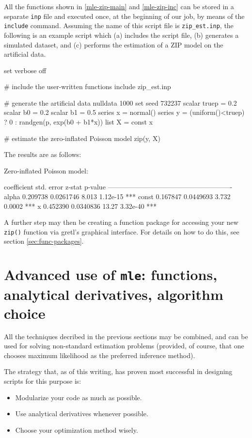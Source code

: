 All the functions shown in \ref{mle-zip-main} and \ref{mle-zip-inc} can
be stored in a separate \texttt{inp} file and executed once, at the
beginning of our job, by means of the \texttt{include}
command.  Assuming the name of this script file is
\texttt{zip\_est.inp}, the following is an example script which
(a) includes the script file, (b) generates a simulated dataset,
and (c) performs the estimation of a ZIP model on the artificial data.

\begin{code}
set verbose off

# include the user-written functions
include zip_est.inp

# generate the artificial data
nulldata 1000
set seed 732237
scalar truep = 0.2
scalar b0 = 0.2
scalar b1 = 0.5
series x = normal()
series y = (uniform()<truep) ? 0 : randgen(p, exp(b0 + b1*x))
list X = const x

# estimate the zero-inflated Poisson model
zip(y, X)
\end{code}

The results are as follows:

\begin{code}
Zero-inflated Poisson model:

             coefficient   std. error   z-stat   p-value 
  -------------------------------------------------------
  alpha       0.209738     0.0261746     8.013   1.12e-15 ***
  const       0.167847     0.0449693     3.732   0.0002   ***
  x           0.452390     0.0340836    13.27    3.32e-40 ***
\end{code}

A further step may then be creating a function package for accessing
your new \texttt{zip()} function via gretl's graphical interface. For
details on how to do this, see section \ref{sec:func-packages}.

\section{Advanced use of \texttt{mle}: functions, analytical
  derivatives, algorithm choice}
\label{sec:mle-adv}

All the techniques decribed in the previous sections may be combined,
and  can be used for solving non-standard estimation problems
(provided, of course, that one chooses maximum likelihood as the
preferred inference method).

The strategy that, as of this writing, has proven most successful in
designing scripts for this purpose is:
\begin{itemize}
\item Modularize your code as much as possible.
\item Use analytical derivatives whenever possible.
\item Choose your optimization method wisely.
\end{itemize}

